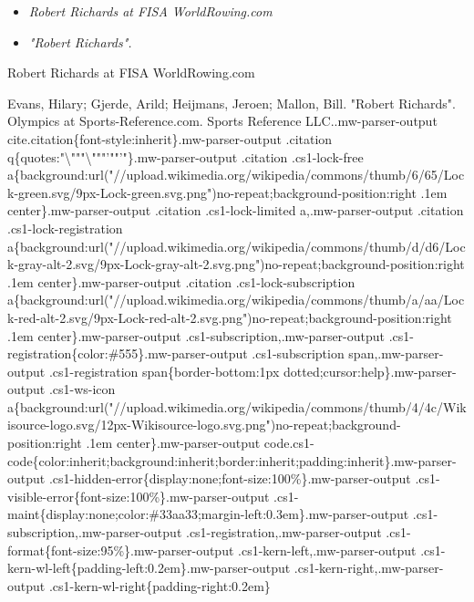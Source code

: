\begin{itemize}
\item
  \emph{Robert Richards at FISA WorldRowing.com}
\item
  \emph{"Robert Richards".}
\end{itemize}

Robert Richards at FISA WorldRowing.com

Evans, Hilary; Gjerde, Arild; Heijmans, Jeroen; Mallon, Bill. "Robert
Richards". Olympics at Sports-Reference.com. Sports Reference
LLC..mw-parser-output
cite.citation\{font-style:inherit\}.mw-parser-output .citation
q\{quotes:"\textbackslash{}"""\textbackslash{}"""'""'"\}.mw-parser-output
.citation .cs1-lock-free
a\{background:url("//upload.wikimedia.org/wikipedia/commons/thumb/6/65/Lock-green.svg/9px-Lock-green.svg.png")no-repeat;background-position:right
.1em center\}.mw-parser-output .citation .cs1-lock-limited
a,.mw-parser-output .citation .cs1-lock-registration
a\{background:url("//upload.wikimedia.org/wikipedia/commons/thumb/d/d6/Lock-gray-alt-2.svg/9px-Lock-gray-alt-2.svg.png")no-repeat;background-position:right
.1em center\}.mw-parser-output .citation .cs1-lock-subscription
a\{background:url("//upload.wikimedia.org/wikipedia/commons/thumb/a/aa/Lock-red-alt-2.svg/9px-Lock-red-alt-2.svg.png")no-repeat;background-position:right
.1em center\}.mw-parser-output .cs1-subscription,.mw-parser-output
.cs1-registration\{color:\#555\}.mw-parser-output .cs1-subscription
span,.mw-parser-output .cs1-registration span\{border-bottom:1px
dotted;cursor:help\}.mw-parser-output .cs1-ws-icon
a\{background:url("//upload.wikimedia.org/wikipedia/commons/thumb/4/4c/Wikisource-logo.svg/12px-Wikisource-logo.svg.png")no-repeat;background-position:right
.1em center\}.mw-parser-output
code.cs1-code\{color:inherit;background:inherit;border:inherit;padding:inherit\}.mw-parser-output
.cs1-hidden-error\{display:none;font-size:100\%\}.mw-parser-output
.cs1-visible-error\{font-size:100\%\}.mw-parser-output
.cs1-maint\{display:none;color:\#33aa33;margin-left:0.3em\}.mw-parser-output
.cs1-subscription,.mw-parser-output .cs1-registration,.mw-parser-output
.cs1-format\{font-size:95\%\}.mw-parser-output
.cs1-kern-left,.mw-parser-output
.cs1-kern-wl-left\{padding-left:0.2em\}.mw-parser-output
.cs1-kern-right,.mw-parser-output
.cs1-kern-wl-right\{padding-right:0.2em\}
